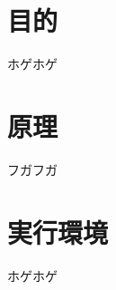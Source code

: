 \documentclass[a4j]{jarticle}
\begin{document}
\section{目的}
ホゲホゲ

\section{原理}
フガフガ

\section{実行環境}
ホゲホゲ
\end{document}
